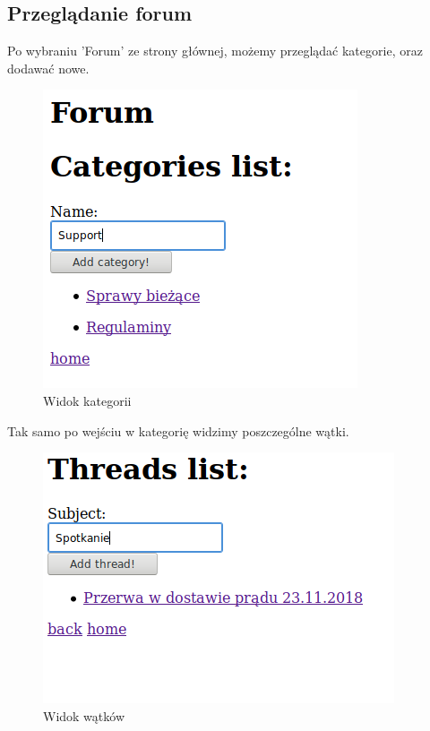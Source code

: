 \documentclass[12pt]{article}
\begin{document}
	\subsection{Przeglądanie forum}
	Po wybraniu 'Forum' ze strony głównej, możemy przeglądać kategorie, oraz dodawać nowe.
	\begin{figure}[H]
		\centering
		\includegraphics[scale=0.7]{img/10.png}
		\caption{Widok kategorii}
	\end{figure}
	Tak samo po wejściu w kategorię widzimy poszczególne wątki.
	\begin{figure}[H]
		\centering
		\includegraphics[scale=0.7]{img/11.png}
		\caption{Widok wątków}
	\end{figure}
\end{document}
